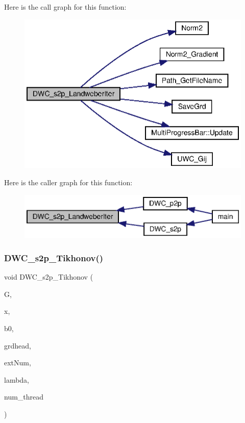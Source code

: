 Here is the call graph for this function\+:
\nopagebreak
\begin{figure}[H]
\begin{center}
\leavevmode
\includegraphics[width=342pt]{Conti2D_8cpp_a7730328c8e132ff0a35142a6d31bac18_a7730328c8e132ff0a35142a6d31bac18_cgraph}
\end{center}
\end{figure}
Here is the caller graph for this function\+:\nopagebreak
\begin{figure}[H]
\begin{center}
\leavevmode
\includegraphics[width=347pt]{Conti2D_8cpp_a7730328c8e132ff0a35142a6d31bac18_a7730328c8e132ff0a35142a6d31bac18_icgraph}
\end{center}
\end{figure}
\mbox{\label{Conti2D_8cpp_abe7855476a24f6e1aa660919f2824d27_abe7855476a24f6e1aa660919f2824d27}} 
\subsubsection{D\+W\+C\+\_\+s2p\+\_\+\+Tikhonov()}
{\footnotesize\ttfamily void D\+W\+C\+\_\+s2p\+\_\+\+Tikhonov (\begin{DoxyParamCaption}\item[{double $\ast$$\ast$}]{G,  }\item[{double $\ast$}]{x,  }\item[{double $\ast$}]{b0,  }\item[{\textbf{ Grd\+Head}}]{grdhead,  }\item[{int}]{ext\+Num,  }\item[{double}]{lambda,  }\item[{int}]{num\+\_\+thread }\end{DoxyParamCaption})}



